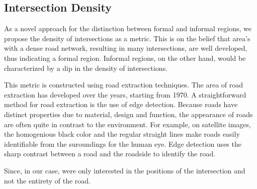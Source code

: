\subsection{Intersection Density}

%

As a novel approach for the distinction between formal and informal regions, we
propose the density of intersections as a metric. This is on the belief that
area's with a dense road network, resulting in many intersections, are well
developed, thus indicating a formal region. Informal regions, on the other
hand, would be characterized by a dip in the density of intersections.  

This metric is constructed using road extraction techniques. The area of road
extraction has developed over the years, starting from 1970. A straightforward
method for road extraction is the use of edge detection. Because roads have
distinct properties due to material, design and function, the appearance of
roads are often quite in contrast to the environment. For example, on satellite
images, the homogenious black color and the regular straight lines make
roads easily identifiable from the suroundings for the human eye. Edge
detection uses the sharp contrast between a road and the roadside to identify
the road.

Since, in our case, were only interested in the positions of the intersection
and not the entirety of the road. 
